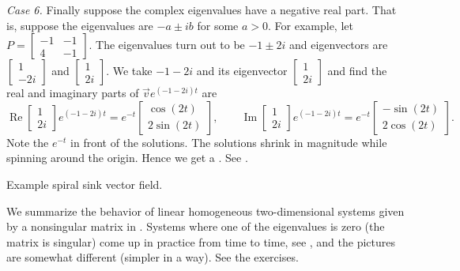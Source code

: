 \medskip

\emph{Case 6.} Finally suppose the complex eigenvalues have a negative real
part.  That is, suppose the eigenvalues are $-a \pm ib$ for some $a > 0$.
For example, let $P = 
\left[ \begin{smallmatrix} -1 & -1 \\ 4 & -1 \end{smallmatrix} \right]$.
The eigenvalues turn out to be $-1\pm 2i$ and eigenvectors are
$\left[ \begin{smallmatrix} 1 \\ -2i \end{smallmatrix} \right]$ and
$\left[ \begin{smallmatrix} 1 \\ 2i \end{smallmatrix} \right]$.  We take
$-1 - 2i$ and its eigenvector
$\left[ \begin{smallmatrix} 1 \\ 2i \end{smallmatrix} \right]$ and find
the real and imaginary parts of
$\vec{v} e^{(-1-2i)t}$ are
\begin{equation*}
\operatorname{Re}
\begin{bmatrix} 1 \\ 2i \end{bmatrix} e^{(-1-2i)t} =
e^{-t}
\begin{bmatrix} \cos (2t) \\ 2 \sin (2t)  \end{bmatrix} ,
\qquad
\operatorname{Im}
\begin{bmatrix} 1 \\ 2i \end{bmatrix} e^{(-1-2i)t} =
e^{-t}
\begin{bmatrix} -\sin (2t) \\ 2 \cos (2t) \end{bmatrix} .
\end{equation*}
Note the $e^{-t}$ in front of the solutions.  The solutions
shrink in magnitude while spinning around the origin.  Hence we get
a \emph{}.
See .

\begin{myfig}
\capstart
{}
\caption{Example spiral sink vector field.\label{pln:spiral-sinkfig}}
\end{myfig}

\medskip

We summarize the behavior of linear homogeneous two-dimensional systems
given by a nonsingular matrix
in .
Systems where one of the eigenvalues is zero (the matrix is singular)
come up in practice from time to time, see
, and the pictures are somewhat
different (simpler in a way).  See the exercises.

